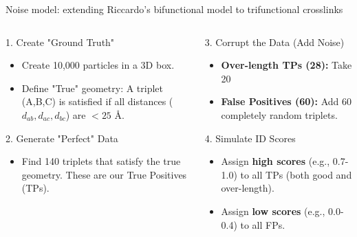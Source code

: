 \documentclass[a4paper,8pt]{beamer}
\begin{document}
\begin{frame}{Noise model: extending Riccardo's bifunctional model to trifunctional crosslinks}
    
    \begin{columns}
    
        \begin{column}{0.45\textwidth}
            \begin{block}{1. Create "Ground Truth"}
                \begin{itemize}
                    \item Create 10,000 particles in a 3D box.
                    \item Define "True" geometry: A triplet (A,B,C) is satisfied if all distances ($d_{ab}, d_{ac}, d_{bc}$) are $< 25$ \AA.
                \end{itemize}
            \end{block}
            
            \begin{block}{2. Generate "Perfect" Data}
                \begin{itemize}
                    \item Find 140 triplets that satisfy the true geometry. These are our True Positives (TPs).
                \end{itemize}
            \end{block}
        \end{column}
    
        \begin{column}{0.45\textwidth}
            \begin{block}{3. Corrupt the Data (Add Noise)}
                \begin{itemize}
                    \item \textbf{Over-length TPs (28):} Take 20%
                    \item \textbf{False Positives (60):} Add 60 completely random triplets.
                \end{itemize}
            \end{block}
            
            \begin{block}{4. Simulate ID Scores}
                \begin{itemize}
                    \item Assign \textbf{high scores} (e.g., 0.7-1.0) to all TPs (both good and over-length).
                    \item Assign \textbf{low scores} (e.g., 0.0-0.4) to all FPs.
                \end{itemize}
            \end{block}
        \end{column}
        
    \end{columns}

\end{frame}
\end{document}
